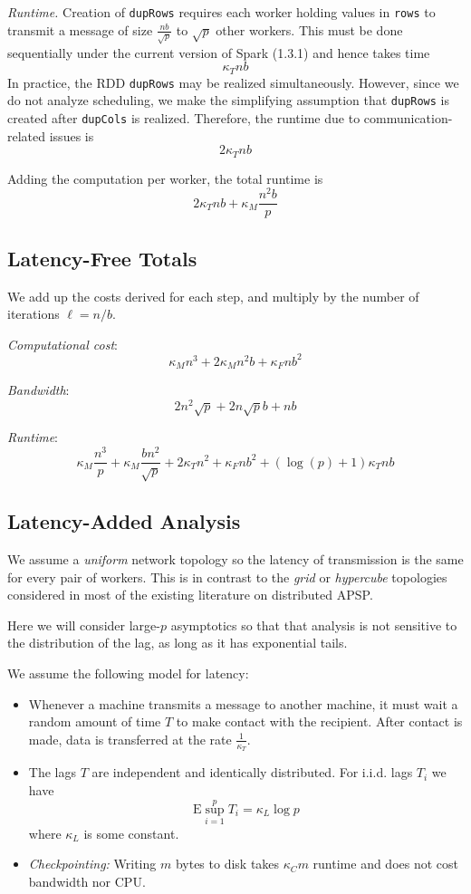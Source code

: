 \documentclass{article} %
\begin{document}
\emph{Runtime.}  Creation of {\tt dupRows} requires each worker
holding values in {\tt rows} to transmit a message of size
$\frac{nb}{\sqrt{p}}$ to $\sqrt{p}$ other workers.  This must be done
sequentially under the current version of Spark (1.3.1) and hence
takes time
\[
\kappa_T nb
\]
In practice, the RDD {\tt dupRows} may be realized simultaneously.
However, since we do not analyze scheduling, we make the simplifying
assumption that {\tt dupRows} is created after {\tt dupCols} is
realized.
Therefore, the runtime due to communication-related issues is
\[
2\kappa_T nb
\]

Adding the computation per worker, the total runtime is
\[
2\kappa_T nb + \kappa_M \frac{n^2b}{p}
\]

\subsection{Latency-Free Totals}

We add up the costs derived for each step, and multiply by the number of iterations $\ell = n/b$.

\emph{Computational cost}:
\[
\kappa_M n^3 + 2\kappa_M n^2 b + \kappa_F n b^2
\]

\emph{Bandwidth}:
\[
2n^2 \sqrt{p} + 2n \sqrt{p} b + nb
\]

\emph{Runtime}:
\[
\kappa_M \frac{n^3}{p} + \kappa_M \frac{bn^2}{\sqrt{p}} + 2\kappa_T n^2 + \kappa_F nb^2 + (\log(p) + 1)\kappa_T nb
\]

\subsection{Latency-Added Analysis}

We assume a \emph{uniform} network topology so the latency of transmission
is the same for every pair of workers.  This is in contrast to the
\emph{grid} or \emph{hypercube} topologies considered in most of the
existing literature on distributed APSP.

Here we will consider large-$p$ asymptotics so that that analysis is
not sensitive to the distribution of the lag, as long as it has
exponential tails.

We assume the following model for latency:
\begin{itemize}
\item Whenever a machine transmits a message to another machine, it
  must wait a random amount of time $T$ to make contact with the
  recipient.  After contact is made, data is transferred at the rate
  $\frac{1}{\kappa_T}$.
\item The lags $T$ are independent and identically distributed.
For i.i.d. lags $T_i$ we have
\[
\text{E} \sup_{i=1}^p T_i = \kappa_L \log p
\]
where $\kappa_L$ is some constant.
\item \emph{Checkpointing:} Writing $m$ bytes to disk takes $\kappa_C
  m$ runtime and does not cost bandwidth nor CPU.
\end{itemize}
\end{document}
